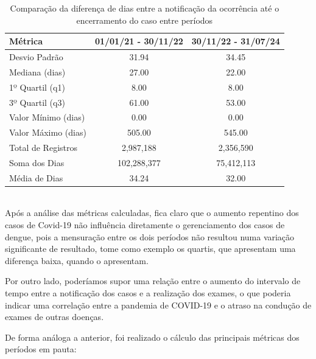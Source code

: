 \documentclass[a4paper,12pt]{article}
\begin{document}
\begin{table}[H]
\centering
\caption{Comparação da diferença de dias entre a notificação da ocorrência até o encerramento do caso entre períodos }
\begin{tabular}{@{}l S[table-format=4.2] S[table-format=4.2]@{}}
\toprule
\textbf{Métrica}          & \textbf{01/01/21 - 30/11/22} & \textbf{30/11/22 - 31/07/24} \\ \midrule
Desvio Padrão                                 & 31.94              & 34.45              \\
Mediana (dias)            & 27.00              & 22.00              \\
1º Quartil (q1)           & 8.00               & 8.00               \\
3º Quartil (q3)           & 61.00              & 53.00              \\
Valor Mínimo (dias)       & 0.00               & 0.00               \\
Valor Máximo (dias)       & 505.00             & 545.00             \\
Total de Registros        & 2,987,188          & 2,356,590          \\
Soma dos Dias             & 102,288,377        & 75,412,113         \\
Média de Dias             & 34.24              & 32.00              \\ \bottomrule
\end{tabular}
\label{tab:comparison}
\end{table} \\

Após a análise das métricas calculadas, fica claro que o aumento repentino dos casos de Covid-19 não influência diretamente o gerenciamento dos casos de dengue, pois a mensuração entre os dois períodos não resultou numa variação significante de resultado, tome como exemplo os quartis, que apresentam uma diferença baixa, quando o apresentam.

Por outro lado, poderíamos supor uma relação entre o aumento do intervalo de tempo entre a notificação dos casos e a realização dos exames, o que poderia indicar uma correlação entre a pandemia de COVID-19 e o atraso na condução de exames de outras doenças. 

De forma análoga a anterior, foi realizado o cálculo das principais métricas dos períodos em pauta:
\end{document}
